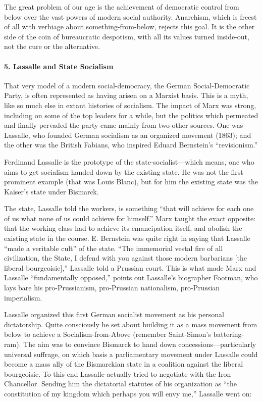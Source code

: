 The great problem of our age is the achievement of democratic control from below over the vast powers of modern social authority. Anarchism, which is freest of all with verbiage about something-from-below, rejects this goal. It is the other side of the coin of bureaucratic despotism, with all its values turned inside-out, not the cure or the alternative.

\paragraph{5. Lassalle and State Socialism}

That very model of a modern social-democracy, the German Social-Democratic Party, is often represented as having arisen on a Marxist basis. This is a myth, like so much else in extant histories of socialism. The impact of Marx was strong, including on some of the top leaders for a while, but the politics which permeated and finally pervaded the party came mainly from two other sources. One was Lassalle, who founded German socialism as an organized movement (1863); and the other was the British Fabians, who inspired Eduard Bernstein's ``revisionism.''

Ferdinand Lassalle is the prototype of the state-socialist---which means, one who aims to get socialism handed down by the existing state. He was not the first prominent example (that was Louis Blanc), but for him the existing state was the Kaiser's state under Bismarck.

The state, Lassalle told the workers, is something ``that will achieve for each one of us what none of us could achieve for himself.'' Marx taught the exact opposite: that the working class had to achieve its emancipation itself, and abolish the existing state in the course. E. Bernstein was quite right in saying that Lassalle ``made a veritable cult'' of the state. ``The immemorial vestal fire of all civilization, the State, I defend with you against those modern barbarians [the liberal bourgeoisie],'' Lassalle told a Prussian court. This is what made Marx and Lassalle ``fundamentally opposed,'' points out Lassalle's biographer Footman, who lays bare his pro-Prussianism, pro-Prussian nationalism, pro-Prussian imperialism.

Lassalle organized this first German socialist movement as his personal dictatorship. Quite consciously he set about building it as a mass movement from below to achieve a Socialism-from-Above (remember Saint-Simon's battering-ram). The aim was to convince Bismarck to hand down concessions---particularly universal suffrage, on which basis a parliamentary movement under Lassalle could become a mass ally of the Bismarckian state in a coalition against the liberal bourgeoisie. To this end Lassalle actually tried to negotiate with the Iron Chancellor. Sending him the dictatorial statutes of his organization as ``the constitution of my kingdom which perhaps you will envy me,'' Lassalle went on:

